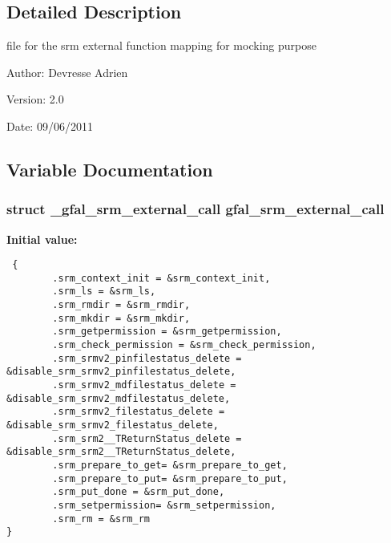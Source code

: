 \subsection{Detailed Description}
file for the srm external function mapping for mocking purpose 

\begin{Desc}
\item[Author:]Devresse Adrien \end{Desc}
\begin{Desc}
\item[Version:]2.0 \end{Desc}
\begin{Desc}
\item[Date:]09/06/2011 \end{Desc}


\subsection{Variable Documentation}
\subsubsection{\setlength{\rightskip}{0pt plus 5cm}struct \bf{\_\-gfal\_\-srm\_\-external\_\-call} gfal\_\-srm\_\-external\_\-call}\label{gfal__common__srm__internal__layer_8c_67b12c7342043451fc5ce31b1a3d74fb}


\textbf{Initial value:}

\begin{Code}\begin{verbatim} { 
        .srm_context_init = &srm_context_init,
        .srm_ls = &srm_ls,
        .srm_rmdir = &srm_rmdir,
        .srm_mkdir = &srm_mkdir,
        .srm_getpermission = &srm_getpermission,
        .srm_check_permission = &srm_check_permission,
        .srm_srmv2_pinfilestatus_delete = &disable_srm_srmv2_pinfilestatus_delete,
        .srm_srmv2_mdfilestatus_delete = &disable_srm_srmv2_mdfilestatus_delete,
        .srm_srmv2_filestatus_delete = &disable_srm_srmv2_filestatus_delete,
        .srm_srm2__TReturnStatus_delete = &disable_srm_srm2__TReturnStatus_delete,
        .srm_prepare_to_get= &srm_prepare_to_get,
        .srm_prepare_to_put= &srm_prepare_to_put,
        .srm_put_done = &srm_put_done,
        .srm_setpermission= &srm_setpermission,
        .srm_rm = &srm_rm
}
\end{verbatim}\end{Code}
